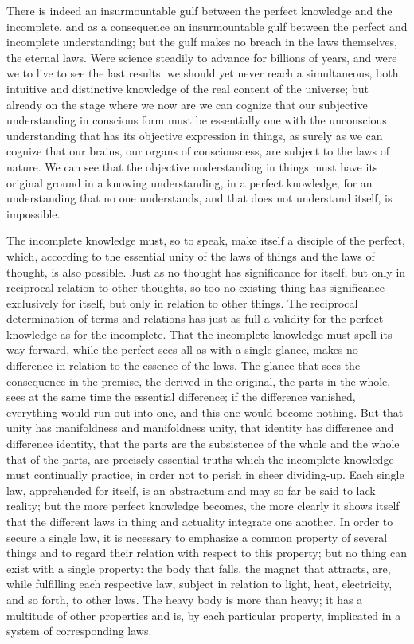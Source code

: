 \documentclass[12pt]{book}
\begin{document}
There is indeed an insurmountable gulf between the perfect knowledge and the
incomplete, and as a consequence an insurmountable gulf between the perfect and
incomplete understanding; but the gulf makes no breach in the laws themselves,
the eternal laws. Were science steadily to advance for billions of years, and
were we to live to see the last results: we should yet never reach a
simultaneous, both intuitive and distinctive knowledge of the real content of
the universe; but already on the stage where we now are we can cognize that our
subjective understanding in conscious form must be essentially one with the
unconscious understanding that has its objective expression in things, as surely
as we can cognize that our brains, our organs of consciousness, are subject to
the laws of nature. We can see that the objective understanding in things must
have its original ground in a knowing understanding, in a perfect knowledge; for
an understanding that no one understands, and that does not understand itself,
is impossible.

The incomplete knowledge must, so to speak, make itself a disciple of the
perfect, which, according to the essential unity of the laws of things and the
laws of thought, is also possible. Just as no thought has significance for
itself, but only in reciprocal relation to other thoughts, so too no existing
thing has significance exclusively for itself, but only in relation to other
things. The reciprocal determination of terms and relations has just as full a
validity for the perfect knowledge as for the incomplete. That the incomplete
knowledge must spell its way forward, while the perfect sees all as with a
single glance, makes no difference in relation to the essence of the laws. The
glance that sees the consequence in the premise, the derived in the original,
the parts in the whole, sees at the same time the essential difference; if the
difference vanished, everything would run out into one, and this one would
become nothing. But that unity has manifoldness and manifoldness unity, that
identity has difference and difference identity, that the parts are the
subsistence of the whole and the whole that of the parts, are precisely
essential truths which the incomplete knowledge must continually practice, in
order not to perish in sheer dividing-up. Each single law, apprehended for
itself, is an abstractum and may so far be said to lack reality; but the more
perfect knowledge becomes, the more clearly it shows itself that the different
laws in thing and actuality integrate one another. In order to secure a single
law, it is necessary to emphasize a common property of several things and to
regard their relation with respect to this property; but no thing can exist with
a single property: the body that falls, the magnet that attracts, are, while
fulfilling each respective law, subject in relation to light, heat, electricity,
and so forth, to other laws. The heavy body is more than heavy; it has a
multitude of other properties and is, by each particular property, implicated in
a system of corresponding laws.
\end{document}
